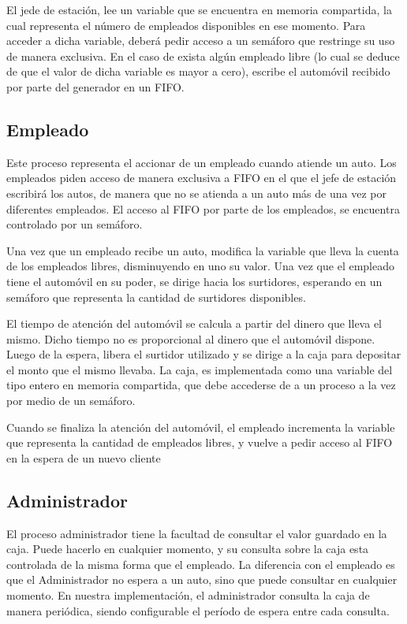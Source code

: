 \documentclass[12pt,a4paper,spanish]{article}
\begin{document}
		El jede de estación, lee un variable que se encuentra en memoria compartida, la cual
		representa el número de empleados disponibles en ese momento. Para acceder a dicha variable,
		deberá pedir acceso a un semáforo que restringe su uso de manera exclusiva.
		En el caso de exista algún empleado libre (lo cual se deduce de que el valor de dicha variable
		es mayor a cero), escribe el automóvil recibido por parte del generador en un FIFO.


	\subsection{Empleado}
	
		Este proceso representa el accionar de un empleado cuando atiende un auto. Los empleados piden acceso
		de manera exclusiva a FIFO en el que el jefe de estación escribirá los autos, de manera que no se
		atienda a un auto más de una vez por diferentes empleados. El acceso al FIFO por parte de los empleados,
		se encuentra controlado por un semáforo. 

		Una vez que un empleado recibe un auto, modifica la variable que lleva la cuenta de los empleados libres, 
		disminuyendo en uno su valor. Una vez que el empleado tiene el automóvil en su poder, se dirige hacia los
		surtidores, esperando en un semáforo que representa la cantidad de surtidores disponibles. 

		El tiempo de atención del automóvil se calcula a partir del dinero que lleva el mismo. Dicho tiempo no es
		proporcional al dinero que el automóvil dispone. Luego de la espera, libera el surtidor utilizado y se dirige
		a la caja para depositar el monto que el mismo llevaba. La caja, es implementada como una variable del tipo entero
		en memoria compartida, que debe accederse de a un proceso a la vez por medio de un semáforo.

		Cuando se finaliza la atención del automóvil, el empleado incrementa la variable que representa la cantidad
		de empleados libres, y vuelve a pedir acceso al FIFO en la espera de un nuevo cliente
	
	\subsection{Administrador}
	
	El proceso administrador tiene la facultad de consultar el valor guardado en la caja. Puede hacerlo en cualquier momento, y su consulta sobre la caja esta controlada de la misma forma que el empleado. La diferencia con el empleado es que el Administrador no espera a un auto, sino que puede consultar en cualquier momento. En nuestra implementación, 
	el administrador consulta la caja de manera periódica, siendo configurable el período de espera entre cada consulta.
\end{document}
